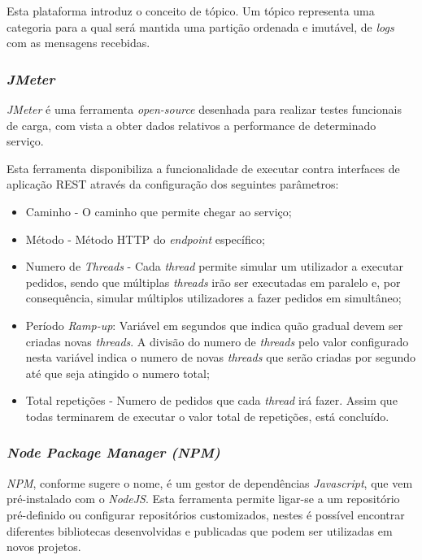 Esta plataforma introduz o conceito de tópico. Um tópico representa uma categoria para a qual será mantida uma partição ordenada e imutável, de \emph{logs} com as mensagens recebidas.

\subsubsection{\emph{JMeter} \label{estado_arte_jmeter}}
\emph{JMeter} é uma ferramenta \emph{open-source} desenhada para realizar testes funcionais de carga, com vista a obter dados relativos a performance de determinado serviço\cite{jmeter}.

Esta ferramenta disponibiliza a funcionalidade de executar contra interfaces de aplicação REST através da configuração dos seguintes parâmetros\cite{jmeter}:
\begin{itemize}
    \item Caminho - O caminho que permite chegar ao serviço;
    \item Método - Método HTTP do \emph{endpoint} específico;
    \item Numero de \emph{Threads} - Cada \emph{thread} permite simular um utilizador a executar pedidos, sendo que múltiplas \emph{threads} irão ser executadas em paralelo e, por consequência, simular múltiplos utilizadores a fazer pedidos em simultâneo;
    \item Período \emph{Ramp-up}: Variável em segundos que indica quão gradual devem ser criadas novas \emph{threads}. A divisão do numero de \emph{threads} pelo valor configurado nesta variável indica o numero de novas \emph{threads} que serão criadas por segundo até que seja atingido o numero total;
    \item Total repetições - Numero de pedidos que cada \emph{thread} irá fazer. Assim que todas terminarem de executar o valor total de repetições, está concluído.
\end{itemize}

\subsubsection{\emph{Node Package Manager (NPM) \label{sym:npm}}\label{estado_arte_npm}}
\emph{NPM}, conforme sugere o nome, é um gestor de dependências \emph{Javascript}, que vem pré-instalado com o \emph{NodeJS}.
Esta ferramenta permite ligar-se a um repositório pré-definido ou configurar repositórios customizados, nestes é possível encontrar diferentes bibliotecas desenvolvidas e publicadas que podem ser utilizadas em novos projetos\cite{npm_explanation}.

